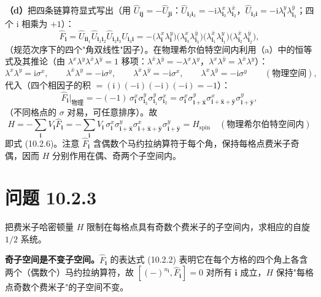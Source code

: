 \textbf{（d）}把四条链算符显式写出（用 $\hat U_{\pmb{i}\pmb j}=-\hat U_{\pmb{j}\pmb i}$：$\hat U_{\pmb i_2\pmb i_3}=-\mathrm{i}\lambda_{\pmb i_3}^{x}\lambda_{\pmb i_2}^{\bar x}$，$\hat U_{\pmb i_3\pmb i}=-\mathrm{i}\lambda_{\pmb i}^{y}\lambda_{\pmb i_3}^{\bar y}$；四个 $\mathrm i$ 相乘为 $+1$）：
\begin{equation*}
\hat F_{\pmb i}
=\hat U_{\pmb i\pmb i_1}\hat U_{\pmb i_1\pmb i_2}\hat U_{\pmb i_2\pmb i_3}\hat U_{\pmb i_3\pmb i}
=-\big(\lambda_{\pmb i}^{x}\lambda_{\pmb i}^{y}\big)\big(\lambda_{\pmb i_3}^{x}\lambda_{\pmb i_3}^{\bar y}\big)\big(\lambda_{\pmb i_1}^{\bar x}\lambda_{\pmb i_1}^{y}\big)\big(\lambda_{\pmb i_2}^{\bar x}\lambda_{\pmb i_2}^{\bar y}\big),
\end{equation*}
（规范次序下的四个"角双线性"因子）。在物理希尔伯特空间内利用（a）中的恒等式及其推论（由 $\lambda^{x}\lambda^{y}\lambda^{\bar x}\lambda^{\bar y}=1$ 移项：$\lambda^{\bar x}\lambda^{\bar y}=-\lambda^{x}\lambda^{y}$，$\lambda^{x}\lambda^{\bar y}=\lambda^{\bar x}\lambda^{y}$）：
\begin{equation*}
\lambda^{x}\lambda^{y}=\mathrm{i}\sigma^{x},\qquad
\lambda^{\bar{x}}\lambda^{y}=-\mathrm{i}\sigma^{y},\qquad
\lambda^{\bar{x}}\lambda^{\bar{y}}=-\mathrm{i}\sigma^{x},\qquad
\lambda^{x}\lambda^{\bar{y}}=-\mathrm{i}\sigma^{y}\qquad(\text{物理空间}),
\end{equation*}
代入（四个相因子的积 $=(\mathrm{i})(-\mathrm{i})(-\mathrm{i})(-\mathrm{i})=-1$）：
\begin{equation*}
\hat F_{\pmb i}\Big|_{\text{物理}}
=-(-1)\,\sigma_{\pmb i}^{x}\sigma_{\pmb i_3}^{y}\sigma_{\pmb i_1}^{y}\sigma_{\pmb i_2}^{x}
=\sigma_{\pmb i}^{x}\sigma_{\pmb i+\hat{\pmb x}}^{y}\sigma_{\pmb i+\hat{\pmb x}+\hat{\pmb y}}^{x}\sigma_{\pmb i+\hat{\pmb y}}^{y},
\end{equation*}
（不同格点的 $\sigma$ 对易，可任意排序）。故
\begin{equation*}
\boxed{\;H=-\sum_{\pmb i}V_{\pmb i}\hat F_{\pmb i}
=-\sum_{\pmb i}V_{\pmb i}\,\sigma_{\pmb i}^{x}\sigma_{\pmb i+\hat{\pmb x}}^{y}\sigma_{\pmb i+\hat{\pmb x}+\hat{\pmb y}}^{x}\sigma_{\pmb i+\hat{\pmb y}}^{y}
=H_{\text{spin}}\quad(\text{物理希尔伯特空间内})\;}
\end{equation*}
即式 (10.2.6)。注意 $\hat F_{\pmb i}$ 含偶数个马约拉纳算符于每个角，保持每格点费米子奇偶，因而 $H$ 分别作用在偶、奇两个子空间内。

\section*{问题 10.2.3}
\begin{problem}
把费米子哈密顿量 $H$ 限制在每格点具有奇数个费米子的子空间内，求相应的自旋 $1/2$ 系统。
\end{problem}
\solution
\textbf{奇子空间是不变子空间。}$\hat F_{\pmb i}$ 的表达式 (10.2.2) 表明它在每个方格的四个角上各含两个（偶数个）马约拉纳算符，故 $[(-)^{n_{\pmb i}},\hat F_{\pmb i}]=0$ 对所有 $\pmb i$ 成立，$H$ 保持"每格点奇数个费米子"的子空间不变。


